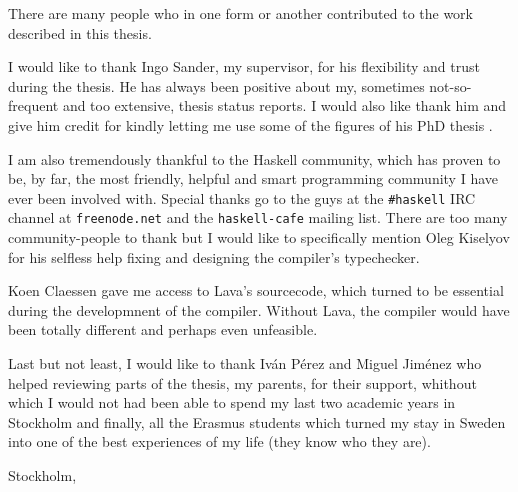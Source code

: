There are many people who in one form or another contributed to the work
described in this thesis. 

I would like to thank Ingo Sander, my supervisor, for his flexibility
and trust during the thesis.  He has always been positive about my,
sometimes not-so-frequent and too extensive, thesis status reports. I
would also like thank him and give him credit for kindly letting me
use some of the figures of his PhD thesis \cite{forsyde:thesis}.

I am also tremendously thankful to the Haskell community, which has proven to
be, by far, the most friendly, helpful and smart programming community I have
ever been involved with. Special thanks go to the guys at the
\texttt{\#haskell} IRC channel at \texttt{freenode.net} and the
\texttt{haskell-cafe} mailing list. There are too many community-people to
thank but I would like to specifically mention Oleg Kiselyov for his selfless
help fixing and designing the compiler's typechecker.

Koen Claessen gave me access to Lava's sourcecode, which turned to be essential
during the developmnent of the compiler. Without Lava, the compiler would
have been totally different and perhaps even unfeasible.

Last but not least, I would like to thank Iv\'{a}n P\'{e}rez and
Miguel Jim\'{e}nez who helped reviewing parts of the thesis, my
parents, for their support, whithout which I would not had been able
to spend my last two academic years in Stockholm and finally, all the
Erasmus students which turned my stay in Sweden into one of the best
experiences of my life (they know who they are).

\vspace{\baselineskip} 
\noindent Stockholm, \thedate

\vspace{\baselineskip} 
\noindent\theauthor